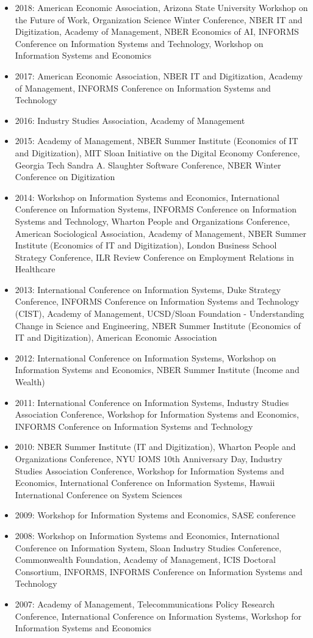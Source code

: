 \documentclass[10pt,letterpaper]{article}
\begin{document}
\begin{itemize}
\item 2018: American Economic Association, Arizona State University Workshop on
  the Future of Work, Organization Science Winter Conference, NBER IT and
  Digitization, Academy of Management, NBER Economics of AI, INFORMS Conference
  on Information Systems and Technology, Workshop on Information Systems and Economics
\item 2017: American Economic Association, NBER IT and Digitization, Academy of Management, INFORMS Conference on Information Systems and Technology 
\item 2016: Industry Studies Association, Academy of Management
\item 2015: Academy of Management, NBER Summer Institute (Economics of IT and Digitization), MIT Sloan Initiative on the Digital Economy Conference, Georgia Tech Sandra A. Slaughter Software Conference, NBER Winter Conference on Digitization
\item 2014: Workshop on Information Systems and Economics, International Conference on Information Systems, INFORMS Conference on Information Systems and Technology, Wharton People and Organizations Conference, American Sociological Association, Academy of Management, NBER Summer Institute (Economics of IT and Digitization), 
London Business School Strategy Conference, ILR Review Conference on Employment Relations in Healthcare
\item 2013: International Conference on Information Systems, Duke Strategy Conference, INFORMS Conference on Information Systems and Technology (CIST), Academy of Management, UCSD/Sloan Foundation - Understanding Change in Science and Engineering, NBER Summer Institute (Economics of IT and Digitization), American Economic Association
\item 2012: International Conference on Information Systems, Workshop on Information Systems and Economics, NBER Summer Institute (Income and Wealth)
\item 2011: International Conference on Information Systems, Industry Studies Association Conference, Workshop for Information Systems and Economics, INFORMS Conference on Information Systems and Technology
\item 2010: NBER Summer Institute (IT and Digitization), Wharton People and Organizations Conference, NYU IOMS 10th Anniversary Day, Industry Studies Association Conference, Workshop for Information Systems and Economics, International Conference on Information Systems, Hawaii International Conference on System Sciences
\item 2009: Workshop for Information Systems and Economics, SASE conference
\item 2008: Workshop on Information Systems and Economics, International Conference on Information System, Sloan Industry Studies Conference, Commonwealth Foundation, Academy of Management, ICIS Doctoral Consortium, INFORMS, INFORMS Conference on Information Systems and Technology
\item 2007: Academy of Management, Telecommunications Policy Research Conference, International Conference on Information Systems, Workshop for Information Systems and Economics
\end{itemize}
\end{document}
